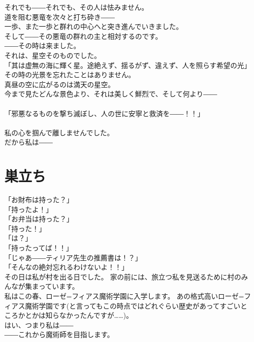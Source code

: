 \documentclass[oneside, a4paper]{jsbook}
\begin{document}
それでも――それでも、その人は怯みません。\\
道を阻む悪竜を次々と打ち砕き――\\
一歩、また一歩と群れの中心へと突き進んでいきました。\\

そして――その悪竜の群れの主と相対するのです。\\

――その時は来ました。\\
それは、星空そのものでした。\\

\noindent
「其は虚無の海に輝く星。途絶えず、揺るがず、違えず、人を照らす希望の光」\\

その時の光景を忘れたことはありません。\\
真昼の空に広がるのは満天の星空。\\
今まで見たどんな景色より、それは美しく鮮烈で、そして何より――\\\\
「邪悪なるものを撃ち滅ぼし、人の世に安寧と救済を――！！」\\\\
私の心を掴んで離しませんでした。\\
だから私は――
\newpage
\section{巣立ち}

\noindent
「お財布は持った？」\\
「持ったよ！」\\
「お弁当は持った？」\\
「持った！」\\
「は？」\\
「持ったってば！！」\\
「じゃあ――ティリア先生の推薦書は！？」\\
「そんなの絶対忘れるわけないよ！！」\\

その日は私が村を出る日でした。
家の前には、旅立つ私を見送るために村のみんなが集まっています。\\
私はこの春、ローゼ=フィアス魔術学園に入学します。
あの格式高いローゼ=フィアス魔術学園です(と言ってもこの時点ではどれぐらい歴史があってすごいところかとかは知らなかったんですが……)。\\
はい、つまり私は――\\

――これから魔術師を目指します。\\
\end{document}
